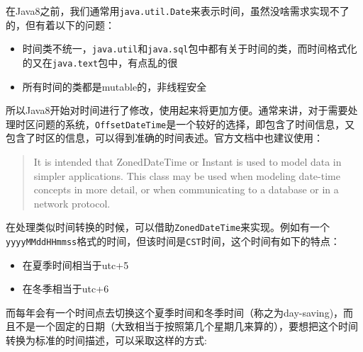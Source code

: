 \documentclass[12pt]{article}
\begin{document}
在Java8之前，我们通常用\texttt{java.util.Date}来表示时间，虽然没啥需求实现不了的，但有着以下的问题：

\begin{itemize}
\tightlist
\item
  时间类不统一，\texttt{java.util}和\texttt{java.sql}包中都有关于时间的类，而时间格式化的又在\texttt{java.text}包中，有点乱的很
\item
  所有时间的类都是mutable的，非线程安全
\end{itemize}

所以Java8开始对时间进行了修改，使用起来将更加方便。通常来讲，对于需要处理时区问题的系统，\texttt{OffsetDateTime}是一个较好的选择，即包含了时间信息，又包含了时区的信息，可以得到准确的时间表述。官方文档中也建议使用：

\begin{quote}
It is intended that ZonedDateTime or Instant is used to model data in simpler applications. This class may be used when modeling date-time concepts in more detail, or when communicating to a database or in a network protocol.
\end{quote}

在处理类似时间转换的时候，可以借助\texttt{ZonedDateTime}来实现。例如有一个\texttt{yyyyMMddHHmmss}格式的时间，但该时间是\texttt{CST}时间，这个时间有如下的特点：

\begin{itemize}
\tightlist
\item
  在夏季时间相当于utc+5
\item
  在冬季相当于utc+6
\end{itemize}

而每年会有一个时间点去切换这个夏季时间和冬季时间（称之为day-saving)，而且不是一个固定的日期（大致相当于按照第几个星期几来算的），要想把这个时间转换为标准的时间描述，可以采取这样的方式:

\begin{Shaded}
\begin{Highlighting}[]
\OperatorTok{=}\OperatorTok{(}
    \OperatorTok{,}\OperatorTok{(}\OperatorTok{));}
\OperatorTok{=}\OperatorTok{(}
\OperatorTok{,} \OperatorTok{(}\OperatorTok{));}
\OperatorTok{=}
    \OperatorTok{()}
    \OperatorTok{(}\OperatorTok{);}
\end{Highlighting}
\end{Shaded}
\end{document}
